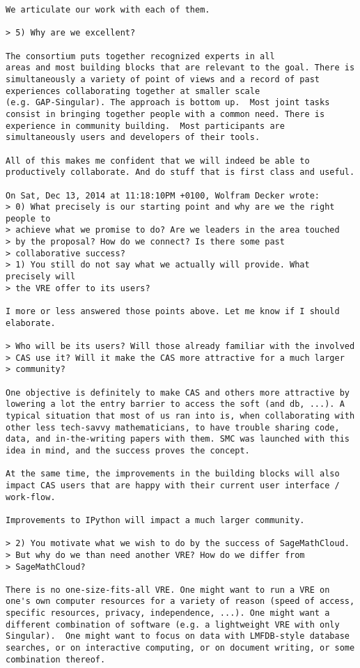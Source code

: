 \begin{draft}
\begin{verbatim}
We articulate our work with each of them.

> 5) Why are we excellent?

The consortium puts together recognized experts in all
areas and most building blocks that are relevant to the goal. There is
simultaneously a variety of point of views and a record of past
experiences collaborating together at smaller scale
(e.g. GAP-Singular). The approach is bottom up.  Most joint tasks
consist in bringing together people with a common need. There is
experience in community building.  Most participants are
simultaneously users and developers of their tools.

All of this makes me confident that we will indeed be able to
productively collaborate. And do stuff that is first class and useful.

On Sat, Dec 13, 2014 at 11:18:10PM +0100, Wolfram Decker wrote:
> 0) What precisely is our starting point and why are we the right people to
> achieve what we promise to do? Are we leaders in the area touched
> by the proposal? How do we connect? Is there some past
> collaborative success?
> 1) You still do not say what we actually will provide. What precisely will
> the VRE offer to its users?

I more or less answered those points above. Let me know if I should
elaborate.

> Who will be its users? Will those already familiar with the involved
> CAS use it? Will it make the CAS more attractive for a much larger
> community?

One objective is definitely to make CAS and others more attractive by
lowering a lot the entry barrier to access the soft (and db, ...). A
typical situation that most of us ran into is, when collaborating with
other less tech-savvy mathematicians, to have trouble sharing code,
data, and in-the-writing papers with them. SMC was launched with this
idea in mind, and the success proves the concept.

At the same time, the improvements in the building blocks will also
impact CAS users that are happy with their current user interface /
work-flow.

Improvements to IPython will impact a much larger community.

> 2) You motivate what we wish to do by the success of SageMathCloud.
> But why do we than need another VRE? How do we differ from
> SageMathCloud?

There is no one-size-fits-all VRE. One might want to run a VRE on
one's own computer resources for a variety of reason (speed of access,
specific resources, privacy, independence, ...). One might want a
different combination of software (e.g. a lightweight VRE with only
Singular).  One might want to focus on data with LMFDB-style database
searches, or on interactive computing, or on document writing, or some
combination thereof.


\end{verbatim}
\end{draft}
